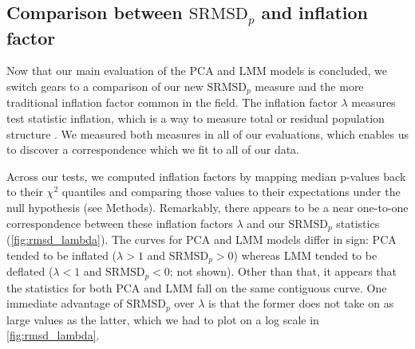 \documentclass[11pt]{article}
\newcommand{\rmsd}{\text{SRMSD}_p}
\begin{document}
\subsection{Comparison between $\rmsd$ and inflation factor}

Now that our main evaluation of the PCA and LMM models is concluded, we switch gears to a comparison of our new $\rmsd$ measure and the more traditional inflation factor common in the field.
The inflation factor $\lambda$ measures test statistic inflation, which is a way to measure total or residual population structure \citep{price_new_2010}.
We measured both measures in all of our evaluations, which enables us to discover a correspondence which we fit to all of our data.

Across our tests, we computed inflation factors by mapping median p-values back to their $\chi^2$ quantiles and comparing those values to their expectations under the null hypothesis (see Methods).
Remarkably, there appears to be a near one-to-one correspondence between these inflation factors $\lambda$ and our $\rmsd$ statistics (\cref{fig:rmsd_lambda}).
The curves for PCA and LMM models differ in sign: PCA tended to be inflated ($\lambda > 1$ and $\rmsd > 0$) whereas LMM tended to be deflated ($\lambda < 1$ and $\rmsd < 0$; not shown).
Other than that, it appears that the statistics for both PCA and LMM fall on the same contiguous curve.
One immediate advantage of $\rmsd$ over $\lambda$ is that the former does not take on as large values as the latter, which we had to plot on a log scale in \cref{fig:rmsd_lambda}.
\end{document}
